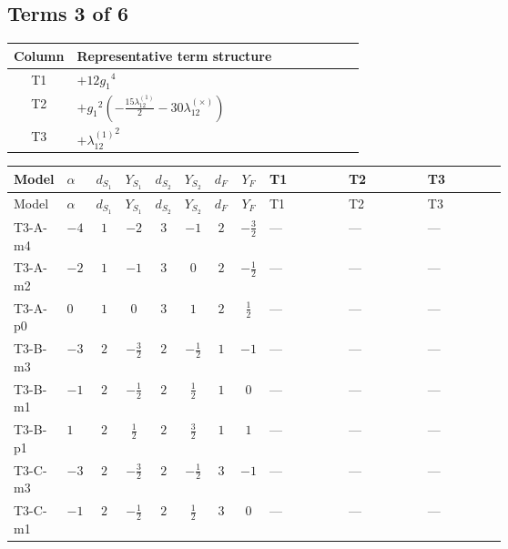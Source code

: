\documentclass[8pt]{article}
\begin{document}
\begin{landscape}
\subsection*{Terms 3 of 6}
\begin{center}
\begin{tabular}{@{}c >{\raggedright\arraybackslash}p{0.82\linewidth}@{}}
\toprule
Column & Representative term structure \\
\midrule
T1 & \(\displaystyle +12 {g_1}^4\) \\
\midrule
T2 & \(\displaystyle +{g_1}^2 \left(-\frac{15 {\lambda_{12}^{(1)}}}{2}-30 {\lambda_{12}^{(\times)}}\right)\) \\
\midrule
T3 & \(\displaystyle +{\lambda_{12}^{(1)}}^2\) \\
\midrule
\bottomrule
\end{tabular}
\end{center}
\smallskip
\tiny
\begin{longtable}{@{}llcccccc >{\raggedright\arraybackslash}p{0.21\linewidth} >{\raggedright\arraybackslash}p{0.21\linewidth} >{\raggedright\arraybackslash}p{0.21\linewidth}@{}}
\toprule
Model & $\alpha$ & $d_{S_1}$ & $Y_{S_1}$ & $d_{S_2}$ & $Y_{S_2}$ & $d_F$ & $Y_F$ & T1 & T2 & T3 \\
\midrule
\endfirsthead
\toprule
Model & $\alpha$ & $d_{S_1}$ & $Y_{S_1}$ & $d_{S_2}$ & $Y_{S_2}$ & $d_F$ & $Y_F$ & T1 & T2 & T3 \\
\midrule
\endhead
T3-A-m4 & $-4$ & $1$ & $-2$ & $3$ & $-1$ & $2$ & $-\frac{3}{2}$ & --- & --- & --- \\
\midrule
T3-A-m2 & $-2$ & $1$ & $-1$ & $3$ & $0$ & $2$ & $-\frac{1}{2}$ & --- & --- & --- \\
\midrule
T3-A-p0 & $0$ & $1$ & $0$ & $3$ & $1$ & $2$ & $\frac{1}{2}$ & --- & --- & --- \\
\midrule
T3-B-m3 & $-3$ & $2$ & $-\frac{3}{2}$ & $2$ & $-\frac{1}{2}$ & $1$ & $-1$ & --- & --- & --- \\
\midrule
T3-B-m1 & $-1$ & $2$ & $-\frac{1}{2}$ & $2$ & $\frac{1}{2}$ & $1$ & $0$ & --- & --- & --- \\
\midrule
T3-B-p1 & $1$ & $2$ & $\frac{1}{2}$ & $2$ & $\frac{3}{2}$ & $1$ & $1$ & --- & --- & --- \\
\midrule
T3-C-m3 & $-3$ & $2$ & $-\frac{3}{2}$ & $2$ & $-\frac{1}{2}$ & $3$ & $-1$ & --- & --- & --- \\
\midrule
T3-C-m1 & $-1$ & $2$ & $-\frac{1}{2}$ & $2$ & $\frac{1}{2}$ & $3$ & $0$ & --- & --- & --- \\
\midrule

\end{longtable}
\end{landscape}
\end{document}
